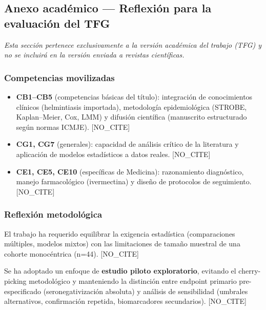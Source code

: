 \documentclass[
  spanish,
  12pt,
  a4paper,
]{article}
\providecommand{\tightlist}{%
  \setlength{\itemsep}{0pt}\setlength{\parskip}{0pt}}
\begin{document}
\newpage

\subsection*{Anexo académico --- Reflexión para la evaluación del
TFG}\label{anexo-acaduxe9mico-reflexiuxf3n-para-la-evaluaciuxf3n-del-tfg}

\emph{Esta sección pertenece exclusivamente a la versión académica del
trabajo (TFG) y no se incluirá en la versión enviada a revistas
científicas.}

\subsubsection{Competencias movilizadas}\label{competencias-movilizadas}

\begin{itemize}
\tightlist
\item
  \textbf{CB1--CB5} (competencias básicas del título): integración de
  conocimientos clínicos (helmintiasis importada), metodología
  epidemiológica (STROBE, Kaplan--Meier, Cox, LMM) y difusión científica
  (manuscrito estructurado según normas ICMJE). {[}NO\_CITE{]}
\item
  \textbf{CG1, CG7} (generales): capacidad de análisis crítico de la
  literatura y aplicación de modelos estadísticos a datos reales.
  {[}NO\_CITE{]}
\item
  \textbf{CE1, CE5, CE10} (específicas de Medicina): razonamiento
  diagnóstico, manejo farmacológico (ivermectina) y diseño de protocolos
  de seguimiento. {[}NO\_CITE{]}
\end{itemize}

\subsubsection{Reflexión
metodológica}\label{reflexiuxf3n-metodoluxf3gica}

El trabajo ha requerido equilibrar la exigencia estadística
(comparaciones múltiples, modelos mixtos) con las limitaciones de tamaño
muestral de una cohorte monocéntrica (n=44). {[}NO\_CITE{]}

Se ha adoptado un enfoque de \textbf{estudio piloto exploratorio},
evitando el cherry-picking metodológico y manteniendo la distinción
entre endpoint primario pre-especificado (seronegativización absoluta) y
análisis de sensibilidad (umbrales alternativos, confirmación repetida,
biomarcadores secundarios). {[}NO\_CITE{]}
\end{document}
